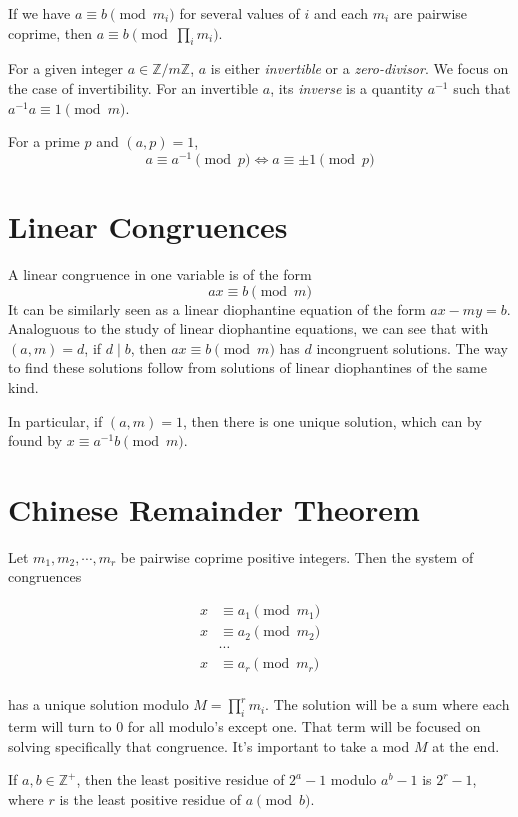 \documentclass{article}
\begin{document}
\begin{multicols*}{2}
If we have $a \equiv b \pmod{m_i}$ for several values of $i$ and each $m_i$ are pairwise coprime, then $a \equiv b \pmod{\prod_im_i}$.

For a given integer $a \in \mathbb{Z}/m\mathbb{Z}$, $a$ is either \textit{invertible} or a \textit{zero-divisor}. We focus on the case of invertibility. For an invertible $a$, its \textit{inverse} is a quantity $a^{-1}$ such that $a^{-1}a \equiv 1 \pmod{m}$.

For a prime $p$ and $(a,p) = 1$, \[a\equiv a^{-1} \pmod{p} \Leftrightarrow a \equiv \pm 1 \pmod{p}\]

\section{Linear Congruences}

A linear congruence in one variable is of the form \[ax \equiv b \pmod{m}\] It can be similarly seen as a linear diophantine equation of the form $ax - my = b$. Analoguous to the study of linear diophantine equations, we can see that with $(a, m) = d$, if $d \mid b$, then $ax \equiv b \pmod{m}$ has $d$ incongruent solutions. The way to find these solutions follow from solutions of linear diophantines of the same kind.

In particular, if $(a,m) = 1$, then there is one unique solution, which can by found by $x \equiv a^{-1}b \pmod{m}$.

\section{Chinese Remainder Theorem}

Let $m_1, m_2, \cdots, m_r$ be pairwise coprime positive integers. Then the system of congruences

\[
\begin{aligned}
x &\equiv a_1 \pmod{m_1} \\
x &\equiv a_2 \pmod{m_2} \\
&\cdots \\
x &\equiv a_r \pmod{m_r} \\
\end{aligned}
\]

has a unique solution modulo $M = \prod_i^rm_i$. The solution will be a sum where each term will turn to 0 for all modulo's except one. That term will be focused on solving specifically that congruence. It's important to take a mod $M$ at the end.

If $a,b \in \mathbb{Z}^+$, then the least positive residue of $2^a - 1$ modulo $a^b - 1$ is $2^r - 1$, where $r$ is the least positive residue of $a \pmod{b}$.


\end{multicols*}
\end{document}
